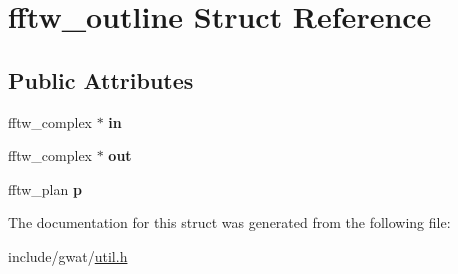 \hypertarget{structfftw__outline}{}\section{fftw\+\_\+outline Struct Reference}
\label{structfftw__outline}
\subsection*{Public Attributes}
\begin{DoxyCompactItemize}
\item 
\mbox{\label{structfftw__outline_abd3c18149bf7fedd74f18f36f1148a6e}} 
fftw\+\_\+complex $\ast$ {\bfseries in}
\item 
\mbox{\label{structfftw__outline_a9b52b935e2b3a1ed2a3884842619a152}} 
fftw\+\_\+complex $\ast$ {\bfseries out}
\item 
\mbox{\label{structfftw__outline_a42f638a5f1b1792685c1897c6cb746ef}} 
fftw\+\_\+plan {\bfseries p}
\end{DoxyCompactItemize}


The documentation for this struct was generated from the following file\+:\begin{DoxyCompactItemize}
\item 
include/gwat/\hyperlink{util_8h}{util.\+h}\end{DoxyCompactItemize}

